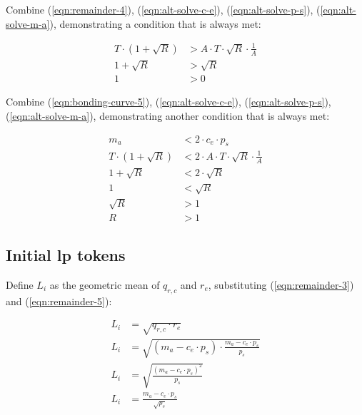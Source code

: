 \documentclass[table, twocolumn]{article}
\begin{document}
Combine (\ref{eqn:remainder-4}), (\ref{eqn:alt-solve-c-e}), (\ref{eqn:alt-solve-p-s}),
(\ref{eqn:alt-solve-m-a}), demonstrating a condition that is always met:

\begin{align}
  T \cdot (1 + \sqrt{R}) & > A \cdot T \cdot \sqrt{R} \cdot \frac{1}{A} \nonumber \\
  1 + \sqrt{R}           & > \sqrt{R}  \nonumber                                  \\
  1                      & > 0
\end{align}

Combine (\ref{eqn:bonding-curve-5}), (\ref{eqn:alt-solve-c-e}),
(\ref{eqn:alt-solve-p-s}), (\ref{eqn:alt-solve-m-a}), demonstrating another condition
that is always met:

\begin{align}
  m_a                    & < 2 \cdot c_e \cdot p_s \nonumber   \\
  T \cdot (1 + \sqrt{R}) & <
  2 \cdot A \cdot T \cdot \sqrt{R} \cdot \frac{1}{A} \nonumber \\
  1 + \sqrt{R}           & < 2 \cdot \sqrt{R} \nonumber        \\
  1                      & < \sqrt{R} \nonumber                \\
  \sqrt{R}               & > 1 \nonumber                       \\
  R                      & > 1
\end{align}

\subsection{Initial \gls*{lp} tokens} \label{sec:initial-lp-tokens}

Define $L_i$ as the geometric mean of $q_{r, c}$ and $r_e$, substituting
(\ref{eqn:remainder-3}) and (\ref{eqn:remainder-5}):

\begin{align}
  L_i & = \sqrt{q_{r, c} \cdot r_e} \nonumber                                  \\
  L_i & =
  \sqrt{(m_a - c_e \cdot p_s) \cdot \frac{m_a - c_e \cdot p_s}{p_s}} \nonumber \\
  L_i & = \sqrt{\frac{(m_a - c_e \cdot p_s) ^ 2}{p_s}} \nonumber               \\
  L_i & =\frac{m_a - c_e \cdot p_s}{\sqrt{p_s}}\end{align}
\end{document}
